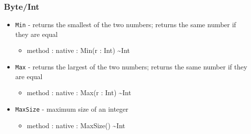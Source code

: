 \documentclass[11pt]{article}
\begin{document}
\subsubsection{Byte/Int}
\begin{itemize}
\item \texttt{Min} - returns the smallest of the two numbers; returns
  the same number if they are equal
  \begin{itemize}
  \item method : native : Min(r : Int) \textasciitilde Int
  \end{itemize}
\item \texttt{Max} - returns the largest of the two numbers; returns
  the same number if they are equal
  \begin{itemize}
  \item method : native : Max(r : Int) \textasciitilde Int
  \end{itemize}

\item \texttt{MaxSize} - maximum size of an integer
  \begin{itemize}
  \item method : native : MaxSize() \textasciitilde Int
  \end{itemize}


\end{itemize}
\end{document}
